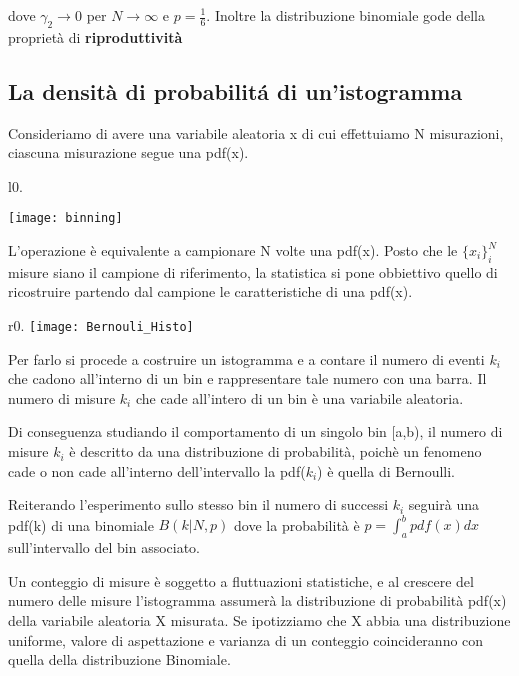 \documentclass[11pt,a4paper]{book}
\begin{document}
dove $\gamma_2 \rightarrow 0$ per $N \rightarrow \infty$ e $p = \frac{1}{6}$.
Inoltre la distribuzione binomiale gode della propriet\`{a} di \textbf{riproduttivit\`{a}}
\subsection{La densit\`{a} di probabilit\'{a} di un'istogramma}



Consideriamo di avere una variabile aleatoria x di cui effettuiamo N misurazioni, ciascuna misurazione segue una pdf(x). 

\begin{wrapfigure}{l}{0.\textwidth}
\centering

\texttt{[image: binning]}	

\end{wrapfigure}

\noindent L'operazione \`{e} equivalente a campionare N volte una pdf(x). Posto che le $\{x_{i}\}_{i}^N$ misure siano il campione di riferimento, la statistica si pone obbiettivo quello di ricostruire partendo dal campione le caratteristiche di una pdf(x).
\begin{wrapfigure}{r}{0.\textwidth}
\centering
\texttt{[image: Bernouli\_Histo]}	

\end{wrapfigure}
\noindent Per farlo si procede a costruire un istogramma e a contare il numero di eventi $k_{i}$ che cadono all'interno di un bin e rappresentare tale numero con una barra. Il numero di misure $k_i$ che cade all'intero di un bin \`{e} una variabile aleatoria.


Di conseguenza studiando il comportamento di un singolo bin [a,b), il numero di misure $k_{i}$ \`{e} descritto da una distribuzione di probabilit\`{a}, poich\`{e} un fenomeno cade o non cade all'interno dell'intervallo la pdf($k_i$) \`{e} quella di Bernoulli. 

Reiterando l'esperimento sullo stesso bin il numero di successi $k_{i}$ seguir\`{a} una pdf(k) di una binomiale $B(k \vert N,p)$ dove la probabilit\`{a} \`{e} $ p = \int_{a}^{b}{pdf(x)dx}$ sull'intervallo del bin associato.

 Un conteggio di misure \`{e} soggetto a fluttuazioni statistiche, e al crescere del numero delle misure l'istogramma assumer\`{a} la distribuzione di probabilit\`{a} pdf(x) della variabile aleatoria X misurata.
\newline
\noindent Se ipotizziamo che X abbia una distribuzione uniforme, valore di aspettazione e varianza di un conteggio coincideranno con quella della distribuzione Binomiale.
\end{document}

